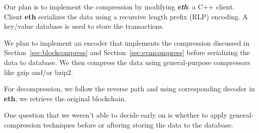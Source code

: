 Our plan is to implement the compression by modifying \textbf{\emph{eth}}:
 a C++ \eth{} client.
Client \textbf{eth} serializes the data using a recursive length prefix (RLP) encoding.
A key/value database is used to store the transactions.

We plan to implement an encoder  that implements the compression  
discussed in Section~\ref{sec:blockcompress} and Section~\ref{sec:evmcompress} 
before serializing the data to database.
We then compress the data using general-purpose compressors like gzip and/or bzip2.

For decompression, we follow the reverse path and using
corresponding decoder in \textbf{eth}, we  retrieve the original blockchain.

One question that we weren't able to decide early on is whether to apply general-compression techniques before or aftering storing the data to the database.
